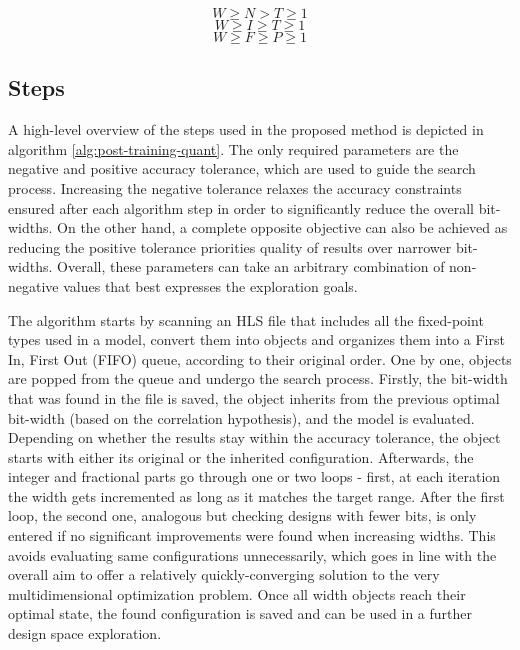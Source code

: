 \begin{equation} \label{eq:width-constraint-1}
  W \geqslant N > T \geqslant 1
\end{equation}
\begin{equation} \label{eq:width-constraint-2}
  W \geqslant I \geqslant T \geqslant 1
\end{equation}
\begin{equation} \label{eq:width-constraint-3}
  W \geqslant F \geqslant P \geqslant 1
\end{equation}

\subsection{Steps}
A high-level overview of the steps used in the proposed method is depicted in algorithm \ref{alg:post-training-quant}. The only required parameters are the negative and positive accuracy tolerance, which are used to guide the search process. Increasing the negative tolerance relaxes the accuracy constraints ensured after each algorithm step in order to significantly reduce the overall bit-widths. On the other hand, a complete opposite objective can also be achieved as reducing the positive tolerance priorities quality of results over narrower bit-widths. Overall, these parameters can take an arbitrary combination of non-negative values that best expresses the exploration goals.

The algorithm starts by scanning an HLS file that includes all the fixed-point types used in a model, convert them into objects and organizes them into a First In, First Out (FIFO) queue, according to their original order. One by one, objects are popped from the queue and undergo the search process. Firstly, the bit-width that was found in the file is saved, the object inherits from the previous optimal bit-width (based on the correlation hypothesis), and the model is evaluated. Depending on whether the results stay within the accuracy tolerance, the object starts with either its original or the inherited configuration. Afterwards, the integer and fractional parts go through one or two loops - first, at each iteration the width gets incremented as long as it matches the target range. After the first loop, the second one, analogous but checking designs with fewer bits, is only entered if no significant improvements were found when increasing widths. This avoids evaluating same configurations unnecessarily, which goes in line with the overall aim to offer a relatively quickly-converging solution to the very multidimensional optimization problem. Once all width objects reach their optimal state, the found configuration is saved and can be used in a further design space exploration.

